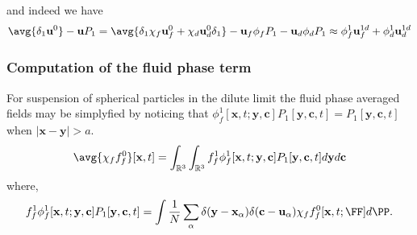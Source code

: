 and indeed we have 
\begin{equation*}
    \avg{\delta_1\textbf{u}^0} - \textbf{u}P_1
    = \avg{\delta_1 \chi_f \textbf{u}_f^0 + \chi_d \textbf{u}_d^0\delta_1 }
    - \textbf{u}_f\phi_fP_1
    - \textbf{u}_d\phi_dP_1
    \approx
    \phi_f^1 \textbf{u}_f^{1d} 
    + \phi_d^1 \textbf{u}_d^{1d}
\end{equation*}

\subsubsection*{Computation of the fluid phase term}

For suspension of spherical particles in the dilute limit the fluid phase averaged fields may be simplyfied by noticing that $\phi_f^1[\textbf{x},t;\textbf{y},\textbf{c}] P_1[\textbf{y},\textbf{c},t] = P_1[\textbf{y},\textbf{c},t]$ when $|\textbf{x} - \textbf{y}| > a$. 
\begin{equation}
    \avg{\chi_f f_f^0}[\textbf{x},t]
    = 
    \int_{\mathbb{R}^3}
    \int_{\mathbb{R}^3}
    f_f^1 \phi_f^1[\textbf{x},t;\textbf{y},\textbf{c}] P_1[\textbf{y},\textbf{c},t]
    d\textbf{y} 
    d\textbf{c}
\end{equation}
where,
\begin{equation*}
    f_f^1 \phi_f^1[\textbf{x},t;\textbf{y},\textbf{c}] P_1[\textbf{y},\textbf{c},t]
    =     
    \int
    \frac{1}{N}
    \sum_\alpha \delta(\textbf{y}-\textbf{x}_\alpha)
     \delta(\textbf{c}-\textbf{u}_\alpha)
    \chi_f
    f^0_f[\textbf{x},t;\FF]
    d\PP.
\end{equation*}

